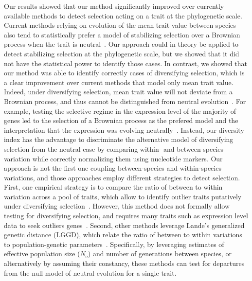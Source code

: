 \documentclass{article}
\newcommand{\Ne}{N_{\text{e}}}
\begin{document}
Our results showed that our method significantly improved over currently available methods to detect selection acting on a trait at the phylogenetic scale.
Current methods relying on evolution of the mean trait value between species also tend to statistically prefer a model of stabilizing selection over a Brownian process when the trait is neutral~\citep{silvestro_measurement_2015, cooper_cautionary_2016, price_detecting_2022}.
Our approach could in theory be applied to detect stabilizing selection at the phylogenetic scale, but we showed that it did not have the statistical power to identify those cases.
In contrast, we showed that our method was able to identify correctly cases of diversifying selection, which is a clear improvement over current methods that model only mean trait value.
Indeed, under diversifying selection, mean trait value will not deviate from a Brownian process, and thus cannot be distinguished from neutral evolution~\citep{hansen_translating_1996, harmon_phylogenetic_2018}.
For example, testing the selective regime in the expression level of the majority of genes led to the selection of a Brownian process as the prefered model and the interpretation that the expression was evolving neutrally~\citep{catalan_drift_2019}.
Instead, our diversity index has the advantage to discriminate the alternative model of diversifying selection from the neutral case by comparing within- and between-species variation while correctly normalizing them using nucleotide markers.
Our approach is not the first one coupling between-species and within-species variations, and those approaches employ different strategies to detect selection.
First, one empirical strategy is to compare the ratio of between to within variation across a pool of traits, which allow to identify outlier traits putatively under diversifying selection~\citep{rohlfs_modeling_2014}.
However, this method does not formally allow testing for diversifying selection, and requires many traits such as expression level data to seek outliers genes~\citep{rohlfs_phylogenetic_2015, gillard_comparative_2021}.
Second, other methods leverage Lande’s generalized genetic distance (LGGD), which relate the ratio of between to within variations to population-genetic parameters~\citep{lynch_analysis_1990, lemos_evolutionary_2001, lemos_rates_2005, weaver_were_2007, porto_rate_2015}.
Specifically, by leveraging estimates of effective population size ($\Ne$) and number of generations between species, or alternatively by assuming their constancy, these methods can test for departures from the null model of neutral evolution for a single trait.
\end{document}
